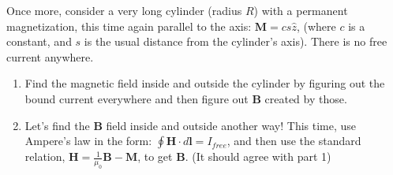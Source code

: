 \documentclass[11pt]{article}
\def\tightlist{}
\begin{document}
Once more, consider a very long cylinder (radius \(R\)) with a permanent
magnetization, this time again parallel to the axis:
\(\mathbf{M} = c s \hat{z}\), (where \(c\) is a constant, and \(s\) is
the usual distance from the cylinder's axis). There is no free current
anywhere.

\begin{enumerate}
\def\labelenumi{\arabic{enumi}.}
\tightlist
\item
  Find the magnetic field inside and outside the cylinder by figuring
  out the bound current everywhere and then figure out \(\mathbf{B}\)
  created by those.
\item
  Let's find the \(\mathbf{B}\) field inside and outside another way!
  This time, use Ampere's law in the form:
  \(\oint \mathbf{H} \cdot d\mathbf{l} = I_{free}\), and then use the
  standard relation,
  \(\mathbf{H} = \frac{1}{\mu_0}\mathbf{B} - \mathbf{M}\), to get
  \(\mathbf{B}\). (It should agree with part 1)
\end{enumerate}
\end{document}
